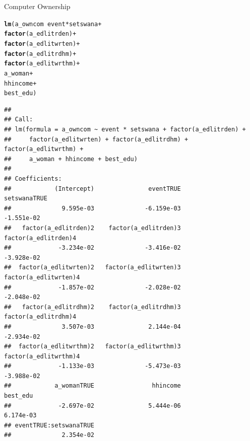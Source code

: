 \documentclass[a4paper,british]{article}\usepackage[]{graphicx}\usepackage[]{color}
\makeatletter
\newcommand{\hlopt}[1]{\textcolor[rgb]{0,0,0}{#1}}%
\newcommand{\hlstd}[1]{\textcolor[rgb]{0.345,0.345,0.345}{#1}}%
\newcommand{\hlkwd}[1]{\textcolor[rgb]{0.737,0.353,0.396}{\textbf{#1}}}%
\newenvironment{kframe}{%
 \def\at@end@of@kframe{}%
 \ifinner\ifhmode%
  \def\at@end@of@kframe{\end{minipage}}%
  \begin{minipage}{\columnwidth}%
 \fi\fi%
 \def\FrameCommand##1{\hskip\@totalleftmargin \hskip-\fboxsep
 \colorbox{shadecolor}{##1}\hskip-\fboxsep
     \hskip-\linewidth \hskip-\@totalleftmargin \hskip\columnwidth}%
 \MakeFramed {\advance\hsize-\width
   \@totalleftmargin\z@ \linewidth\hsize
   \@setminipage}}%
 {\par\unskip\endMakeFramed%
 \at@end@of@kframe}
\newenvironment{knitrout}{}{} %
\makeatother
\begin{document}
\begin{table}[H]
\caption{Computer Ownership}
\label{tab:owncom}

\begin{knitrout}
\color{fgcolor}\begin{kframe}
\begin{alltt}
\hlkwd{lm}\hlstd{(a_owncom} \hlopt{~} \hlstd{event}\hlopt{*}\hlstd{setswana}       \hlopt{+}
              \hlkwd{factor}\hlstd{(a_edlitrden)}  \hlopt{+}
              \hlkwd{factor}\hlstd{(a_edlitwrten)} \hlopt{+}
              \hlkwd{factor}\hlstd{(a_edlitrdhm)}  \hlopt{+}
              \hlkwd{factor}\hlstd{(a_edlitwrthm)} \hlopt{+}
              \hlstd{a_woman}              \hlopt{+}
              \hlstd{hhincome}             \hlopt{+}
              \hlstd{best_edu              )}
\end{alltt}
\begin{verbatim}
## 
## Call:
## lm(formula = a_owncom ~ event * setswana + factor(a_edlitrden) + 
##     factor(a_edlitwrten) + factor(a_edlitrdhm) + factor(a_edlitwrthm) + 
##     a_woman + hhincome + best_edu)
## 
## Coefficients:
##            (Intercept)               eventTRUE            setswanaTRUE  
##              9.595e-03              -6.159e-03              -1.551e-02  
##   factor(a_edlitrden)2    factor(a_edlitrden)3    factor(a_edlitrden)4  
##             -3.234e-02              -3.416e-02              -3.928e-02  
##  factor(a_edlitwrten)2   factor(a_edlitwrten)3   factor(a_edlitwrten)4  
##             -1.857e-02              -2.028e-02              -2.048e-02  
##   factor(a_edlitrdhm)2    factor(a_edlitrdhm)3    factor(a_edlitrdhm)4  
##              3.507e-03               2.144e-04              -2.934e-02  
##  factor(a_edlitwrthm)2   factor(a_edlitwrthm)3   factor(a_edlitwrthm)4  
##             -1.133e-03              -5.473e-03              -3.988e-02  
##            a_womanTRUE                hhincome                best_edu  
##             -2.697e-02               5.444e-06               6.174e-03  
## eventTRUE:setswanaTRUE  
##              2.354e-02
\end{verbatim}
\end{kframe}
\end{knitrout}
\end{table}
\end{document}
